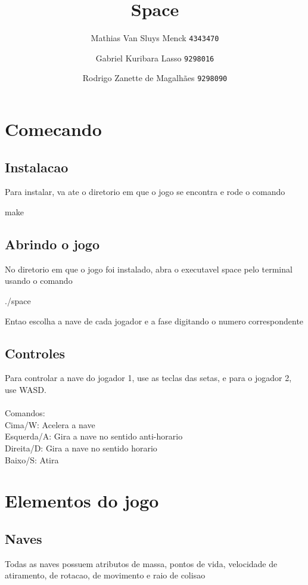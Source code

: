 \documentclass[a4paper]{book}
\title {Space}
\author{
    Mathias Van Sluys Menck 
    \texttt{4343470}
    \and
    Gabriel Kuribara Lasso 
    \texttt{9298016}
    \and
    Rodrigo Zanette de Magalhães 
    \texttt{9298090}
}
\date { }
\begin{document}
\maketitle
\tableofcontents

\chapter {Comecando}

\section {Instalacao}
Para instalar, va ate o diretorio em que o jogo se encontra e rode o comando

make

\section {Abrindo o jogo}

No diretorio em que o jogo foi instalado, abra o executavel space pelo terminal usando o comando 

./space

Entao escolha a nave de cada jogador e a fase digitando o numero correspondente

\section {Controles}
Para controlar a nave do jogador 1, use as teclas das setas, e para o jogador 2, use WASD.
\\\\Comandos:
\\Cima/W: Acelera a nave
\\Esquerda/A: Gira a nave no sentido anti-horario
\\Direita/D: Gira a nave no sentido horario
\\Baixo/S: Atira

\chapter {Elementos do jogo}

\section {Naves}
Todas as naves possuem atributos de massa, pontos de vida, velocidade de atiramento, de rotacao, de movimento e raio de colisao
\end{document}
